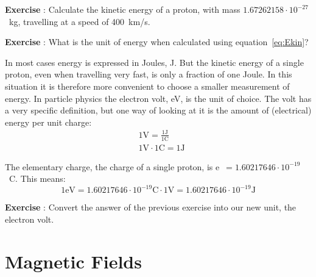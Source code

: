 \begin{shaded}
\textbf{Exercise \theExercise {}} : Calculate the kinetic energy of a proton, with mass $1.67262158 \cdot 10^{-27}$~kg, travelling at a speed of 400~km/s.\end{shaded}

\begin{shaded}
\textbf{Exercise \theExercise {}} : What is the unit of energy when calculated using equation~\ref{eq:Ekin}?\end{shaded}

In most cases energy is expressed in Joules, J. But the kinetic energy of a single proton, even when travelling very fast, is only a fraction of one Joule. In this situation it is therefore more convenient to choose a smaller measurement of energy. In particle physics the electron volt, eV, is the unit of choice. The volt has a very specific definition, but one way of looking at it is the amount of (electrical) energy per unit charge:
\begin{equation}\begin{aligned}
& 1\mbox{V} = \frac{1\mbox{J}}{1\mbox{C}} \\
& 1\mbox{V} \cdot 1\mbox{C} = 1\mbox{J}
\end{aligned}\end{equation}

The elementary charge, the charge of a single proton, is e~$= 1.60217646 \cdot 10^{-19}$~C. This means:
\begin{equation}
1\mbox{eV}=1.60217646 \cdot 10^{-19} \mbox{C} \cdot 1\mbox{V} = 1.60217646 \cdot 10^{-19}\mbox{J}
\end{equation}

\begin{shaded}
\textbf{Exercise \theExercise {}} : Convert the answer of the previous exercise into our new unit, the electron volt.\end{shaded}

\section{Magnetic Fields}
